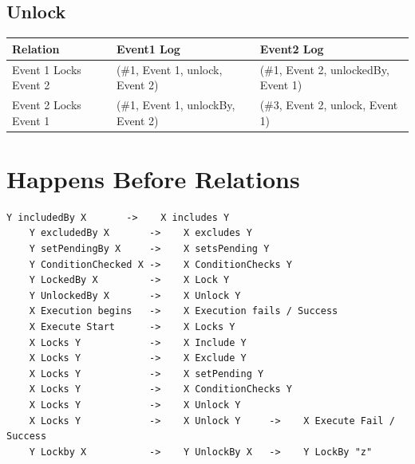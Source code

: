 \subsection{Unlock}
\begin{tabularx}{\textwidth}{|*{3}{>{\raggedright\arraybackslash}X|}}
  \hline
  Relation & Event1 Log & Event2 Log \\
  \hline
  Event 1 Locks Event 2 & (\#1, Event 1, unlock, Event 2) & (\#1, Event 2, unlockedBy, Event 1) \\
  \hline
  Event 2 Locks Event 1 & (\#1, Event 1, unlockBy, Event 2) & (\#3, Event 2, unlock, Event 1) \\
  \hline
\end{tabularx}

\section{Happens Before Relations}

\begin{lstlisting}[breaklines=true]
    Y includedBy X       ->    X includes Y
    Y excludedBy X       ->    X excludes Y
    Y setPendingBy X     ->    X setsPending Y
    Y ConditionChecked X ->    X ConditionChecks Y
    Y LockedBy X         ->    X Lock Y
    Y UnlockedBy X       ->    X Unlock Y
    X Execution begins   ->    X Execution fails / Success
    X Execute Start      ->    X Locks Y
    X Locks Y            ->    X Include Y
    X Locks Y            ->    X Exclude Y
    X Locks Y            ->    X setPending Y
    X Locks Y            ->    X ConditionChecks Y
    X Locks Y            ->    X Unlock Y
    X Locks Y            ->    X Unlock Y     ->    X Execute Fail / Success
    Y Lockby X           ->    Y UnlockBy X   ->    Y LockBy "z"
\end{lstlisting}

